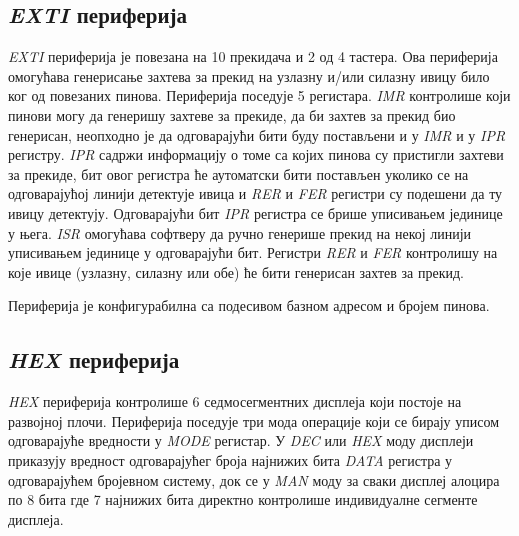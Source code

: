 \subsection{\textit{EXTI} периферија}

\textit{\acrfull{EXTI}} периферија је повезана на 10 прекидача и 2 од 4 тастера. Ова периферија омогућава генерисање захтева за прекид на узлазну и/или силазну ивицу било ког од повезаних пинова. Периферија поседује 5 регистара. \textit{\acrfull{IMR}} контролише који пинови могу да генеришу захтеве за прекиде, да би захтев за прекид био генерисан, неопходно је да одговарајући бити буду постављени и у \textit{\acrshort{IMR}} и у \textit{\acrshort{IPR}} регистру. \textit{\acrfull{IPR}} садржи информацију о томе са којих пинова су пристигли захтеви за прекиде, бит овог регистра ће аутоматски бити постављен уколико се на одговарајућој линији детектује ивица и \textit{\acrshort{RER}} и \textit{\acrshort{FER}} регистри су подешени да ту ивицу детектују. Одговарајући бит \textit{\acrshort{IPR}} регистра се брише уписивањем јединице у њега. \textit{\acrfull{ISR}} омогућава софтверу да ручно генерише прекид на некој линији уписивањем јединице у одговарајући бит. Регистри  \textit{\acrfull{RER}} и \textit{\acrfull{FER}} контролишу на које ивице (узлазну, силазну или обе) ће бити генерисан захтев за прекид.



Периферија је конфигурабилна са подесивом базном адресом и бројем пинова.

\subsection{\textit{HEX} периферија}

\textit{\textit{HEX}} периферија контролише 6 седмосегментних дисплеја који постоје на развојној плочи.
Периферија поседује три мода операције који се бирају уписом одговарајуће вредности у \textit{MODE} регистар.
У \textit{DEC} или \textit{HEX} моду дисплеји приказују вредност одговарајућег броја најнижих бита \textit{DATA} регистра у одговарајућем бројевном систему, док се у \textit{MAN} моду за сваки дисплеј алоцира по 8 бита где 7 најнижих бита директно контролише индивидуалне сегменте дисплеја. 




